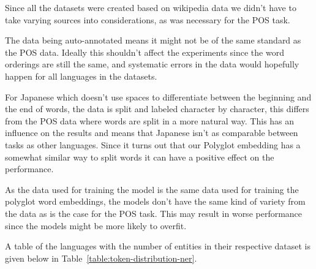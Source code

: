 Since all the datasets were created based on wikipedia data we didn't have to
take varying sources into considerations, as was necessary for the POS task.

The data being auto-annotated means it might not be of the same standard as the
POS data. Ideally this shouldn't affect the experiments since the word orderings
are still the same, and systematic errors in the data would hopefully happen for
all languages in the datasets.

For Japanese which doesn't use spaces to differentiate between the beginning and
the end of words, the data is split and labeled character by character, this
differs from the POS data where words are split in a more natural way. This has
an influence on the results and means that Japanese isn't as comparable between
tasks as other languages. Since it turns out that our Polyglot embedding has a
somewhat similar way to split words it can have a positive effect on the
performance.

As the data used for training the model is the same data used for training the
polyglot word embeddings, the models don't have the same kind of variety from
the data as is the case for the POS task. This may result in worse performance
since the models might be more likely to overfit.

A table of the languages with the number of entities in their respective dataset
is given below in Table~\ref{table:token-distribution-ner}. 


